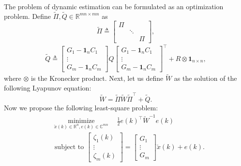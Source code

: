 \documentclass[journal]{IEEEtran}
\newcommand{\Rb}{{\mathbb{R}}}
\newcommand{\Cb}{{\mathbb{C}}}
\newtheorem{proposition}{\textbf{Proposition}}
\begin{document}
	The problem of dynamic estimation can be formulated as an optimization problem. 
	Define $\tilde{\Pi},\tilde{Q} \in \mathbb{R}^{m n \times m n}$ as
	$$
	\tilde{\Pi} \triangleq\left[\begin{array}{ccc}
		\Pi & & \\
		& \ddots & \\
		& & \Pi
	\end{array}\right],
	$$
	\begin{align}
		\tilde{Q} \triangleq
		\begin{bmatrix}
			G_1-\mathbf{1}_{n} C_1 \\
			\vdots \\
			G_m-\mathbf{1}_{n} C_m
		\end{bmatrix}
		Q\begin{bmatrix}
			G_1-\mathbf{1}_{n} C_1 \\
			\vdots \\
			G_m-\mathbf{1}_{n} C_m
		\end{bmatrix}^\top
		+ R\otimes \mathbf{1}_{n\times n},
	\end{align}
	where $\otimes$ is the Kronecker product.
	Next, let us define $\tilde{W}$ as the solution of the following Lyapunov equation:
	$$
	\tilde{W}=\tilde{\Pi} \tilde{W} \tilde{\Pi}^{\top}+\tilde{Q}.
	$$
	Now we propose the following least-square problem:
	\begin{subequations}\label{pb:LS_problem}
		\begin{align}
			&\underset{\check{x}(k)\in \Rb^n, e(k)\in\Cb^{mn}}{\operatorname{minimize}}\quad \frac{1}{2} e(k)^\top \tilde{W}^{-1} e(k)  \\
			&\text { subject to }
			\begin{bmatrix}
				{\zeta}_{1}(k) \\
				\vdots \\
				{\zeta}_{m}(k)
			\end{bmatrix}=
			\begin{bmatrix}
				G_{1} \\
				\vdots \\
				G_{m}
			\end{bmatrix} \check{x}(k)+e(k). 
		\end{align}
	\end{subequations}
\end{document}
